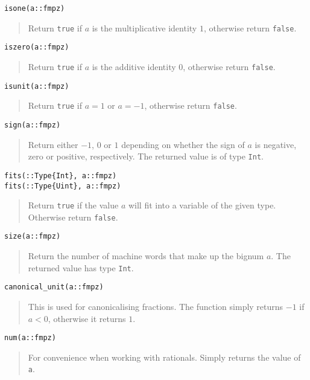 \documentclass[a4paper,10pt]{article}
\newcommand{\code}{\lstinline}
\newcommand{\desc}[1]{\vspace{-3mm}\begin{quote}#1\end{quote}}
\begin{document}
\begin{lstlisting}
isone(a::fmpz)
\end{lstlisting}

\desc{Return \code{true} if $a$ is the multiplicative identity $1$, otherwise
return \code{false}.}

\begin{lstlisting}
iszero(a::fmpz)
\end{lstlisting}

\desc{Return \code{true} if $a$ is the additive identity $0$, otherwise
return \code{false}.}

\begin{lstlisting}
isunit(a::fmpz)
\end{lstlisting}

\desc{Return \code{true} if $a = 1$ or $a = -1$, otherwise return \code{false}.}

\begin{lstlisting}
sign(a::fmpz)
\end{lstlisting}

\desc{Return either $-1$, $0$ or $1$ depending on whether the sign of $a$ is negative,
zero or positive, respectively. The returned value is of type \code{Int}.}

\begin{lstlisting}
fits(::Type{Int}, a::fmpz)
fits(::Type{Uint}, a::fmpz)
\end{lstlisting}

\desc{Return \code{true} if the value $a$ will fit into a variable of the given
type. Otherwise return \code{false}.}

\begin{lstlisting}
size(a::fmpz)
\end{lstlisting}

\desc{Return the number of machine words that make up the bignum $a$. The
returned value has type \code{Int}.}

\begin{lstlisting}
canonical_unit(a::fmpz)
\end{lstlisting}

\desc{This is used for canonicalising fractions. The function simply returns $-1$
if $a < 0$, otherwise it returns $1$.}

\begin{lstlisting}
num(a::fmpz)
\end{lstlisting}

\desc{For convenience when working with rationals. Simply returns the value of \code{a}.}
\end{document}
